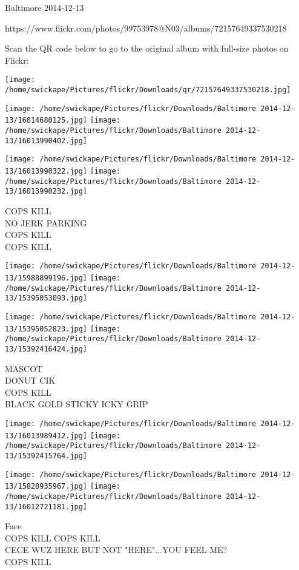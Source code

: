 \documentclass[10pt,letterpaper]{article}
\begin{document}
Baltimore 2014-12-13

https://www.flickr.com/photos/99753978@N03/albums/72157649337530218

Scan the QR code below to go to the original album with full-size photos on Flickr:

\texttt{[image: /home/swickape/Pictures/flickr/Downloads/qr/72157649337530218.jpg]}
\pagebreak

\texttt{[image: /home/swickape/Pictures/flickr/Downloads/Baltimore 2014-12-13/16014680125.jpg]}
\texttt{[image: /home/swickape/Pictures/flickr/Downloads/Baltimore 2014-12-13/16013990402.jpg]}

\texttt{[image: /home/swickape/Pictures/flickr/Downloads/Baltimore 2014-12-13/16013990322.jpg]}
\texttt{[image: /home/swickape/Pictures/flickr/Downloads/Baltimore 2014-12-13/16013990232.jpg]}

COPS KILL\\
NO JERK PARKING\\
COPS KILL\\
COPS KILL\\
\pagebreak

\texttt{[image: /home/swickape/Pictures/flickr/Downloads/Baltimore 2014-12-13/15988899196.jpg]}
\texttt{[image: /home/swickape/Pictures/flickr/Downloads/Baltimore 2014-12-13/15395053093.jpg]}

\texttt{[image: /home/swickape/Pictures/flickr/Downloads/Baltimore 2014-12-13/15395052823.jpg]}
\texttt{[image: /home/swickape/Pictures/flickr/Downloads/Baltimore 2014-12-13/15392416424.jpg]}

MASCOT\\
DONUT CIK\\
COPS KILL\\
BLACK GOLD STICKY ICKY GRIP\\
\pagebreak

\texttt{[image: /home/swickape/Pictures/flickr/Downloads/Baltimore 2014-12-13/16013989412.jpg]}
\texttt{[image: /home/swickape/Pictures/flickr/Downloads/Baltimore 2014-12-13/15392415764.jpg]}

\texttt{[image: /home/swickape/Pictures/flickr/Downloads/Baltimore 2014-12-13/15828935967.jpg]}
\texttt{[image: /home/swickape/Pictures/flickr/Downloads/Baltimore 2014-12-13/16012721181.jpg]}

Face\\
COPS KILL COPS KILL\\
CECE WUZ HERE BUT NOT "HERE"...YOU FEEL ME?\\
COPS KILL\\
\pagebreak
\end{document}

